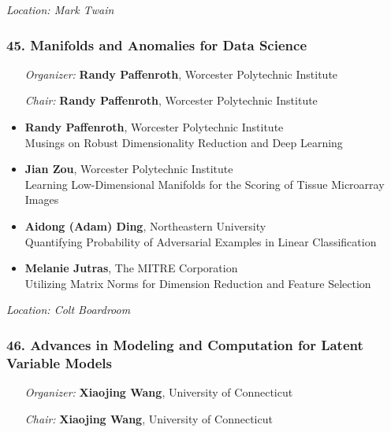 \emph{Location: Mark Twain}

\subsubsection*{45. Manifolds and Anomalies for Data Science}

\begin{enumerate}[align=left]
\item [\emph{Organizer:}] \textbf{Randy Paffenroth}, Worcester Polytechnic Institute
\item [\emph{Chair:}] \textbf{Randy Paffenroth}, Worcester Polytechnic Institute
\end{enumerate}

\begin{itemize}
\item \textbf{Randy Paffenroth}, Worcester Polytechnic Institute \\
Musings on Robust Dimensionality Reduction and Deep Learning
\item \textbf{Jian Zou}, Worcester Polytechnic Institute \\
Learning Low-Dimensional Manifolds for the Scoring of Tissue Microarray Images
\item \textbf{Aidong (Adam) Ding}, Northeastern University \\
Quantifying Probability of Adversarial Examples in Linear Classification
\item \textbf{Melanie Jutras}, The MITRE Corporation \\
Utilizing Matrix Norms for Dimension Reduction and Feature Selection
\end{itemize}

\emph{Location: Colt Boardroom}

\subsubsection*{46. Advances in Modeling and Computation for Latent Variable Models}

\begin{enumerate}[align=left]
\item [\emph{Organizer:}] \textbf{Xiaojing Wang}, University of Connecticut
\item [\emph{Chair:}] \textbf{Xiaojing Wang}, University of Connecticut
\end{enumerate}


